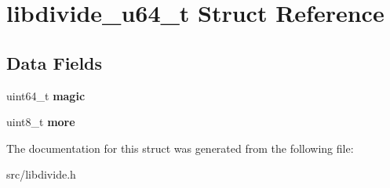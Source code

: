 \hypertarget{structlibdivide__u64__t}{}\section{libdivide\+\_\+u64\+\_\+t Struct Reference}
\label{structlibdivide__u64__t}
\subsection*{Data Fields}
\begin{DoxyCompactItemize}
\item 
\mbox{\label{structlibdivide__u64__t_aa302bbfb8b5601b995bed154fd51f5d1}} 
uint64\+\_\+t {\bfseries magic}
\item 
\mbox{\label{structlibdivide__u64__t_a37d3f9421a54b28d76d5541ec36a74f1}} 
uint8\+\_\+t {\bfseries more}
\end{DoxyCompactItemize}


The documentation for this struct was generated from the following file\+:\begin{DoxyCompactItemize}
\item 
src/libdivide.\+h\end{DoxyCompactItemize}
